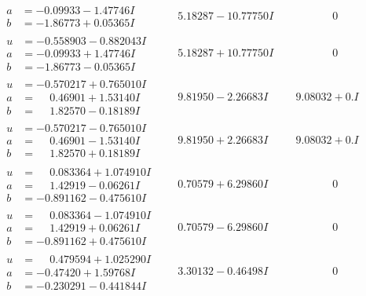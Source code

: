 \documentclass[1p]{elsarticle_modified}
\theoremstyle{definition}
\begin{document}
$$\begin{array}{c|c|c}
\begin{aligned}
a &= -0.09933 - 1.47746 I \\
b &= -1.86773 + 0.05365 I\end{aligned}
 & \phantom{-}5.18287 - 10.77750 I & \phantom{-0.000000 } 0 \\ \hline\begin{aligned}
u &= -0.558903 - 0.882043 I \\
a &= -0.09933 + 1.47746 I \\
b &= -1.86773 - 0.05365 I\end{aligned}
 & \phantom{-}5.18287 + 10.77750 I & \phantom{-0.000000 } 0 \\ \hline\begin{aligned}
u &= -0.570217 + 0.765010 I \\
a &= \phantom{-}0.46901 + 1.53140 I \\
b &= \phantom{-}1.82570 - 0.18189 I\end{aligned}
 & \phantom{-}9.81950 - 2.26683 I & \phantom{-}9.08032 + 0. I\phantom{ +0.000000I} \\ \hline\begin{aligned}
u &= -0.570217 - 0.765010 I \\
a &= \phantom{-}0.46901 - 1.53140 I \\
b &= \phantom{-}1.82570 + 0.18189 I\end{aligned}
 & \phantom{-}9.81950 + 2.26683 I & \phantom{-}9.08032 + 0. I\phantom{ +0.000000I} \\ \hline\begin{aligned}
u &= \phantom{-}0.083364 + 1.074910 I \\
a &= \phantom{-}1.42919 - 0.06261 I \\
b &= -0.891162 - 0.475610 I\end{aligned}
 & \phantom{-}0.70579 + 6.29860 I & \phantom{-0.000000 } 0 \\ \hline\begin{aligned}
u &= \phantom{-}0.083364 - 1.074910 I \\
a &= \phantom{-}1.42919 + 0.06261 I \\
b &= -0.891162 + 0.475610 I\end{aligned}
 & \phantom{-}0.70579 - 6.29860 I & \phantom{-0.000000 } 0 \\ \hline\begin{aligned}
u &= \phantom{-}0.479594 + 1.025290 I \\
a &= -0.47420 + 1.59768 I \\
b &= -0.230291 - 0.441844 I\end{aligned}
 & \phantom{-}3.30132 - 0.46498 I & \phantom{-0.000000 } 0 \\ \hline\begin{aligned}

\end{aligned}
\end{array}$$
\end{document}
